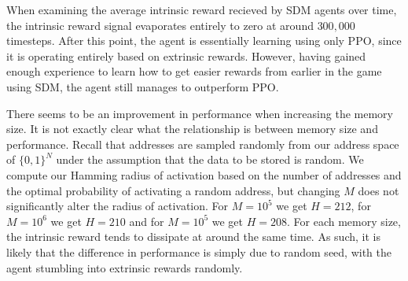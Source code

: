 \documentclass[journal, onecolumn, 12pt, draftclsnofoot]{IEEEtran}
\begin{document}
	\par When examining the average intrinsic reward recieved by SDM agents over time, the intrinsic reward signal evaporates entirely to zero at around $300,000$ timesteps. After this point, the agent is essentially learning using only PPO, since it is operating entirely based on extrinsic rewards. However, having gained enough experience to learn how to get easier rewards from earlier in the game using SDM, the agent still manages to outperform PPO.
	\par There seems to be an improvement in performance when increasing the memory size. It is not exactly clear what the relationship is between memory size and performance. Recall that addresses are sampled randomly from our address space of $\{0, 1\}^N$ under the assumption that the data to be stored is random. We compute our Hamming radius of activation based on the number of addresses and the optimal probability of activating a random address, but changing $M$ does not significantly alter the radius of activation. For $M=10^5$ we get $H=212$, for $M=10^6$ we get $H=210$ and for $M=10^5$ we get $H=208$. For each memory size, the intrinsic reward tends to dissipate at around the same time. As such, it is likely that the difference in performance is simply due to random seed, with the agent stumbling into extrinsic rewards randomly.
\end{document}
